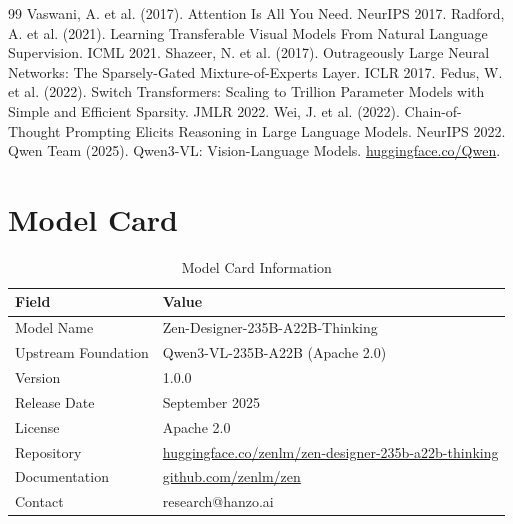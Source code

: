 \documentclass[11pt,a4paper]{article}
\begin{document}
\begin{thebibliography}{99}
 Vaswani, A. et al. (2017). Attention Is All You Need. NeurIPS 2017.
 Radford, A. et al. (2021). Learning Transferable Visual Models From Natural Language Supervision. ICML 2021.
 Shazeer, N. et al. (2017). Outrageously Large Neural Networks: The Sparsely-Gated Mixture-of-Experts Layer. ICLR 2017.
 Fedus, W. et al. (2022). Switch Transformers: Scaling to Trillion Parameter Models with Simple and Efficient Sparsity. JMLR 2022.
 Wei, J. et al. (2022). Chain-of-Thought Prompting Elicits Reasoning in Large Language Models. NeurIPS 2022.
 Qwen Team (2025). Qwen3-VL: Vision-Language Models. \href{https://huggingface.co/Qwen}{huggingface.co/Qwen}.
\end{thebibliography}

\appendix

\section{Model Card}

\begin{table}[H]
\centering
\begin{tabular}{ll}
\toprule
\textbf{Field} & \textbf{Value} \\
\midrule
Model Name & Zen-Designer-235B-A22B-Thinking \\
Upstream Foundation & Qwen3-VL-235B-A22B (Apache 2.0) \\
Version & 1.0.0 \\
Release Date & September 2025 \\
License & Apache 2.0 \\
Repository & \href{https://huggingface.co/zenlm/zen-designer-235b-a22b-thinking}{huggingface.co/zenlm/zen-designer-235b-a22b-thinking} \\
Documentation & \href{https://github.com/zenlm/zen}{github.com/zenlm/zen} \\
Contact & research@hanzo.ai \\
\bottomrule
\end{tabular}
\caption{Model Card Information}
\end{table}
\end{document}
